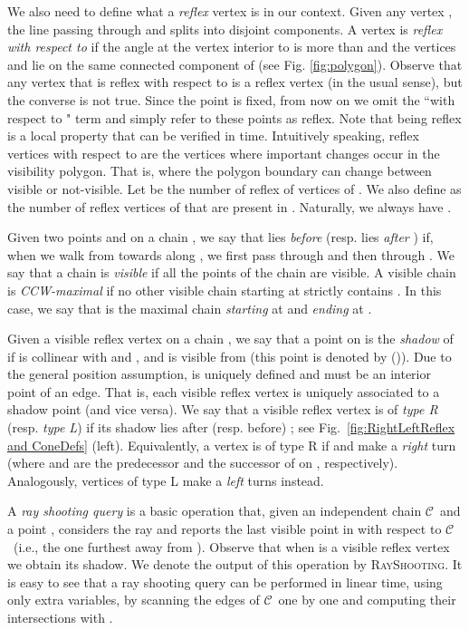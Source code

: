 \documentclass[a4paper]{article}
\newcommand{\C}{\ensuremath{{\mathcal C}}}
\begin{document}
We also need to define what a \emph{reflex} vertex is in our context. Given any vertex , the line  passing through  and  splits  into disjoint components. A vertex  is \emph{reflex with respect to } if the angle at the vertex interior to  is more than  and the vertices  and  lie on the same connected component of  (see Fig. \ref{fig:polygon}). 
Observe that any vertex that is reflex with respect to  is a reflex vertex (in the usual sense), but the converse is not true. Since the point  is fixed, from now on we omit the ``with respect to " term and simply refer to these points as reflex. 
Note that being reflex is a local property that can be verified in  time.
Intuitively speaking, reflex vertices with respect to  are the vertices where important changes occur in the visibility polygon. That is, where the polygon boundary can change between visible or not-visible. Let  be the number of reflex of  vertices of . We also define  as the number of reflex vertices of  that are present in . Naturally, we always have .

Given two points  and  on a chain , we say that  lies \emph{before}  (resp.  lies \emph{after} ) if, when we walk from  towards  along , we first pass through  and then through . We say that a chain is {\em visible} if all the points of the chain are visible. A visible chain  is \emph{CCW-maximal} if no other visible chain starting at  strictly contains . In this case, we say that  is the maximal chain {\em starting} at  and {\em ending} at .




Given a visible reflex vertex  on a chain , we say that a point  on  is the \emph{shadow} of  if  is collinear with  and , and  is visible from  (this point is denoted by ()). Due to the general position assumption,  is uniquely defined and  must be an interior point of an edge. That is, each visible reflex vertex is uniquely associated to a shadow point (and vice versa). We say that a visible reflex vertex  is of \emph{type R} (resp. \emph{type L}) if its shadow lies after (resp. before) ; see Fig.~\ref{fig:RightLeftReflex and ConeDefs} (left). 
Equivalently, a vertex  is of type R if  and  make a \emph{right} turn (where  and  are the predecessor and the successor of  on , respectively). 
Analogously, vertices of type L make a \emph{left} turns instead. 

A \emph{ray shooting query} is a basic operation that, given an independent chain \C\ and a point , considers the ray  and reports the last visible point in  with respect to \C\ (i.e., the one furthest away from ). Observe that when  is a visible reflex vertex we obtain its shadow. We denote the output of this operation by \textsc{RayShooting}. It is easy to see that a ray shooting query can be performed in linear time, using only  extra variables, by scanning the edges of \C\ one by one and computing their intersections with . 
\end{document}
